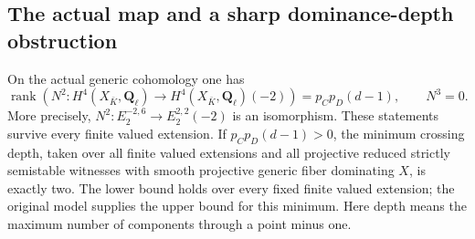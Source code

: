 \subsection{The actual map and a sharp dominance-depth obstruction}

\begin{theorem}
\label{r22dw:monodromy}
On the actual generic cohomology one has
\[
 \operatorname{rank}\!\left(N^2:H^4(X_{\bar K},\mathbf Q_\ell)
                    \longrightarrow H^4(X_{\bar K},\mathbf Q_\ell)(-2)\right)
                       =p_Cp_D(d-1),\qquad N^3=0.
 \tag{DW22.10}\label{r22dw:rank}
\]
More precisely,
$N^2:E_2^{-2,6}\to E_2^{2,2}(-2)$ is an isomorphism.  These
statements survive every finite valued extension.  If
$p_Cp_D(d-1)>0$, the minimum crossing depth, taken over all finite
valued extensions and all projective reduced strictly semistable
witnesses with smooth projective generic fiber dominating $X$, is
exactly two.  The lower bound holds over every fixed finite valued
extension; the original model supplies the upper bound for this
minimum.  Here depth means the maximum number of components through
a point minus one.
\end{theorem}

